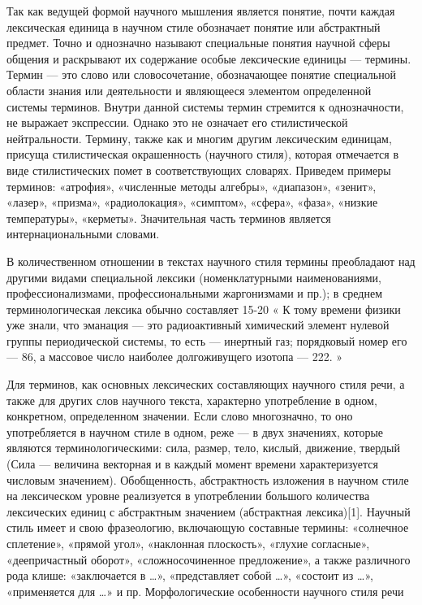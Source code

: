 \documentclass[12pt]{llncs}
\begin{document}
Так как ведущей формой научного мышления является понятие, почти каждая лексическая единица в научном стиле обозначает понятие или абстрактный предмет. Точно и однозначно называют специальные понятия научной сферы общения и раскрывают их содержание особые лексические единицы — термины. Термин — это слово или словосочетание, обозначающее понятие специальной области знания или деятельности и являющееся элементом определенной системы терминов. Внутри данной системы термин стремится к однозначности, не выражает экспрессии. Однако это не означает его стилистической нейтральности. Термину, также как и многим другим лексическим единицам, присуща стилистическая окрашенность (научного стиля), которая отмечается в виде стилистических помет в соответствующих словарях. Приведем примеры терминов: «атрофия», «численные методы алгебры», «диапазон», «зенит», «лазер», «призма», «радиолокация», «симптом», «сфера», «фаза», «низкие температуры», «керметы». Значительная часть терминов является интернациональными словами.

В количественном отношении в текстах научного стиля термины преобладают над другими видами специальной лексики (номенклатурными наименованиями, профессионализмами, профессиональными жаргонизмами и пр.); в среднем терминологическая лексика обычно составляет 15-20 %
« 	К тому времени физики уже знали, что эманация — это радиоактивный химический элемент нулевой группы периодической системы, то есть — инертный газ; порядковый номер его — 86, а массовое число наиболее долгоживущего изотопа — 222. 	»

Для терминов, как основных лексических составляющих научного стиля речи, а также для других слов научного текста, характерно употребление в одном, конкретном, определенном значении. Если слово многозначно, то оно употребляется в научном стиле в одном, реже — в двух значениях, которые являются терминологическими: сила, размер, тело, кислый, движение, твердый (Сила — величина векторная и в каждый момент времени характеризуется числовым значением). Обобщенность, абстрактность изложения в научном стиле на лексическом уровне реализуется в употреблении большого количества лексических единиц с абстрактным значением (абстрактная лексика)[1]. Научный стиль имеет и свою фразеологию, включающую составные термины: «солнечное сплетение», «прямой угол», «наклонная плоскость», «глухие согласные», «деепричастный оборот», «сложносочиненное предложение», а также различного рода клише: «заключается в …», «представляет собой …», «состоит из …», «применяется для …» и пр.
Морфологические особенности научного стиля речи
\end{document}
